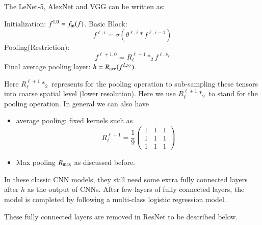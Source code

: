 The  LeNet-5, AlexNet and VGG
can be written as:
\begin{breakablealgorithm}
	\footnotesize
	\caption{$ h = \text{Classic CNN}(f; J,\nu_1, \cdots, \nu_J)$}
	\label{alg:presnet}
	\begin{algorithmic}[1]
		\State Initialization:  $f^{1,0} = f_{\rm in}(f)$.
		\State Basic Block:
		\begin{equation}\label{ori-ResNet}
		f^{\ell,i} = \sigma \left( \theta^{\ell,i} \ast f^{\ell,i-1}\right)
		\end{equation}
		\EndFor
		\State Pooling(Restriction):
		\begin{equation}
		\label{ori-ResNet0}
		f^{\ell+1,0} = R_\ell^{\ell+1} \ast_2 f^{\ell, \nu_\ell} 
		\end{equation}
		\EndFor
		\State Final average pooling layer:
		$h =  R_{\rm ave}( f^{L,\nu_\ell})$.
	\end{algorithmic}
\end{breakablealgorithm}

Here $R_\ell^{\ell+1} \ast_2$ represents for the pooling operation to 
sub-sampling these tensors into coarse spatial level (lower resolution).
Here we use $R_\ell^{\ell+1} \ast_2$ to stand for the pooling operation. 
In general we can also have
\begin{itemize}
	\item average pooling: fixed kernels such as 
	\begin{equation}\label{key}
	R_\ell^{\ell+1}  = \frac{1}{9} 
	\begin{pmatrix}
	1 & 1 & 1 \\
	1 & 1 & 1 \\
	1 & 1 & 1
	\end{pmatrix}
	\end{equation}
	\item Max pooling $R_{\rm max}$ as discussed before.
\end{itemize}

In these classic CNN models, they still need some 
extra fully connected layers after $h$ as the output of CNNs. 
After few layers of fully connected layers, the model is completed by following
a multi-class logistic regression model.

These fully connected layers are removed in ResNet to be described below.


